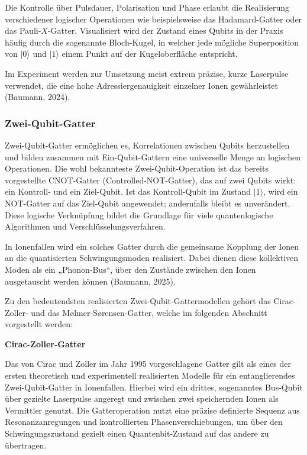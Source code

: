Die Kontrolle über Pulsdauer, Polarisation und Phase erlaubt die Realisierung verschiedener logischer Operationen wie beispielsweise das Hadamard-Gatter oder das Pauli-\( X \)-Gatter. Visualisiert wird der Zustand eines Qubits in der Praxis häufig durch die sogenannte Bloch-Kugel, in welcher jede mögliche Superposition von \( \lvert 0 \rangle \) und \( \lvert 1 \rangle \) einem Punkt auf der Kugeloberfläche entspricht.

Im Experiment werden zur Umsetzung meist extrem präzise, kurze Laserpulse verwendet, die eine hohe Adressiergenauigkeit einzelner Ionen gewährleistet (Baumann, 2024).

\subsubsection{Zwei-Qubit-Gatter}

Zwei-Qubit-Gatter ermöglichen es, Korrelationen zwischen Qubits herzustellen und bilden zusammen mit Ein-Qubit-Gattern eine universelle Menge an logischen Operationen. Die wohl bekannteste Zwei-Qubit-Operation ist das bereits vorgestellte CNOT-Gatter (Controlled-NOT-Gatter), das auf zwei Qubits wirkt: ein Kontroll- und ein Ziel-Qubit. Ist das Kontroll-Qubit im Zustand \( \lvert 1 \rangle \), wird ein NOT-Gatter auf das Ziel-Qubit angewendet; andernfalls bleibt es unverändert. Diese logische Verknüpfung bildet die Grundlage für viele quantenlogische Algorithmen und Verschlüsselungsverfahren.

In Ionenfallen wird ein solches Gatter durch die gemeinsame Kopplung der Ionen an die quantisierten Schwingungsmoden realisiert. Dabei dienen diese kollektiven Moden als ein „Phonon-Bus“, über den Zustände zwischen den Ionen ausgetauscht werden können (Baumann, 2025).

Zu den bedeutendsten realisierten Zwei-Qubit-Gattermodellen gehört das Cirac-Zoller- und das Mølmer-Sørensen-Gatter, welche im folgenden Abschnitt vorgestellt werden:

\newpage
\textbf{Cirac-Zoller-Gatter} 

Das von Cirac und Zoller im Jahr 1995 vorgeschlagene Gatter gilt als eines der ersten theoretisch und experimentell realisierten Modelle für ein entanglierendes Zwei-Qubit-Gatter in Ionenfallen. Hierbei wird ein drittes, sogenanntes Bus-Qubit über gezielte Laserpulse angeregt und zwischen zwei speichernden Ionen als Vermittler genutzt. Die Gatteroperation nutzt eine präzise definierte Sequenz aus Resonanzanregungen und kontrollierten Phasenverschiebungen, um über den Schwingungszustand gezielt einen Quantenbit-Zustand auf das andere zu übertragen.

